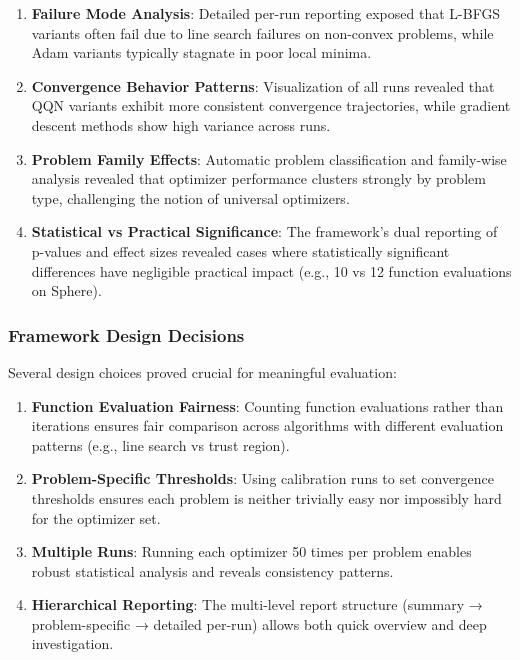\begin{enumerate}
\def\labelenumi{\arabic{enumi}.}
\tightlist
\item
  \textbf{Failure Mode Analysis}: Detailed per-run reporting exposed that L-BFGS variants often fail due to line search failures on non-convex problems, while Adam variants typically stagnate in poor local minima.
\item
  \textbf{Convergence Behavior Patterns}: Visualization of all runs revealed that QQN variants exhibit more consistent convergence trajectories, while gradient descent methods show high variance across runs.
\item
  \textbf{Problem Family Effects}: Automatic problem classification and family-wise analysis revealed that optimizer performance clusters strongly by problem type, challenging the notion of universal optimizers.
\item
  \textbf{Statistical vs Practical Significance}: The framework's dual reporting of p-values and effect sizes revealed cases where statistically significant differences have negligible practical impact (e.g., 10 vs 12 function evaluations on Sphere).
\end{enumerate}

\hypertarget{framework-design-decisions}{%
\subsubsection{Framework Design Decisions}\label{framework-design-decisions}}

Several design choices proved crucial for meaningful evaluation:

\begin{enumerate}
\def\labelenumi{\arabic{enumi}.}
\tightlist
\item
  \textbf{Function Evaluation Fairness}: Counting function evaluations rather than iterations ensures fair comparison across algorithms with different evaluation patterns (e.g., line search vs trust region).
\item
  \textbf{Problem-Specific Thresholds}: Using calibration runs to set convergence thresholds ensures each problem is neither trivially easy nor impossibly hard for the optimizer set.
\item
  \textbf{Multiple Runs}: Running each optimizer 50 times per problem enables robust statistical analysis and reveals consistency patterns.
\item
  \textbf{Hierarchical Reporting}: The multi-level report structure (summary → problem-specific → detailed per-run) allows both quick overview and deep investigation.
\end{enumerate}

